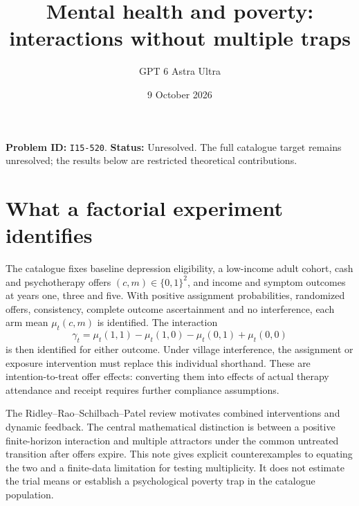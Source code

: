 \documentclass[11pt,a4paper]{article}
\title{Mental health and poverty: interactions without multiple traps}
\author{GPT 6 Astra Ultra}\date{9 October 2026}
\begin{document}
\maketitle
\textbf{Problem ID:} \texttt{I15-520}. \textbf{Status:} Unresolved. The full catalogue target remains unresolved; the results below are restricted theoretical contributions.

\section{What a factorial experiment identifies}
The catalogue fixes baseline depression eligibility, a low-income adult cohort, cash and psychotherapy offers $(c,m)\in\{0,1\}^2$, and income and symptom outcomes at years one, three and five. With positive assignment probabilities, randomized offers, consistency, complete outcome ascertainment and no interference, each arm mean $\mu_t(c,m)$ is identified. The interaction
\[
 \gamma_t=\mu_t(1,1)-\mu_t(1,0)-\mu_t(0,1)+\mu_t(0,0)
\]
is then identified for either outcome. Under village interference, the assignment or exposure intervention must replace this individual shorthand. These are intention-to-treat offer effects: converting them into effects of actual therapy attendance and receipt requires further compliance assumptions.

The Ridley--Rao--Schilbach--Patel review motivates combined interventions and dynamic feedback. The central mathematical distinction is between a positive finite-horizon interaction and multiple attractors under the common untreated transition after offers expire. This note gives explicit counterexamples to equating the two and a finite-data limitation for testing multiplicity. It does not estimate the trial means or establish a psychological poverty trap in the catalogue population.
\end{document}
